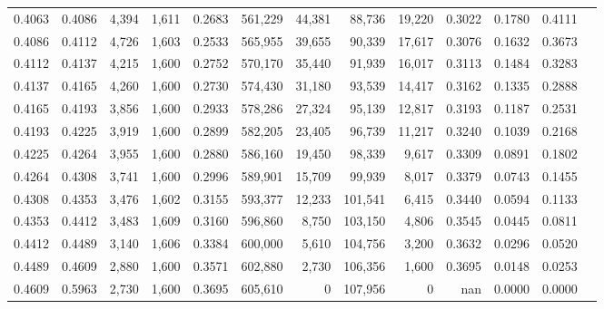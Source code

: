 \begin{tabular}{rrrrrrrrrrrrr}
0.4063 & 0.4086 &  4,394 & 1,611 &                                     0.2683 & 561,229 &  44,381 &  88,736 &  19,220 & 0.3022 & 0.1780 & 0.4111 \\
0.4086 & 0.4112 &  4,726 & 1,603 &                                     0.2533 & 565,955 &  39,655 &  90,339 &  17,617 & 0.3076 & 0.1632 & 0.3673 \\
0.4112 & 0.4137 &  4,215 & 1,600 &                                     0.2752 & 570,170 &  35,440 &  91,939 &  16,017 & 0.3113 & 0.1484 & 0.3283 \\
0.4137 & 0.4165 &  4,260 & 1,600 &                                     0.2730 & 574,430 &  31,180 &  93,539 &  14,417 & 0.3162 & 0.1335 & 0.2888 \\
0.4165 & 0.4193 &  3,856 & 1,600 &                                     0.2933 & 578,286 &  27,324 &  95,139 &  12,817 & 0.3193 & 0.1187 & 0.2531 \\
0.4193 & 0.4225 &  3,919 & 1,600 &                                     0.2899 & 582,205 &  23,405 &  96,739 &  11,217 & 0.3240 & 0.1039 & 0.2168 \\
0.4225 & 0.4264 &  3,955 & 1,600 &                                     0.2880 & 586,160 &  19,450 &  98,339 &   9,617 & 0.3309 & 0.0891 & 0.1802 \\
0.4264 & 0.4308 &  3,741 & 1,600 &                                     0.2996 & 589,901 &  15,709 &  99,939 &   8,017 & 0.3379 & 0.0743 & 0.1455 \\
0.4308 & 0.4353 &  3,476 & 1,602 &                                     0.3155 & 593,377 &  12,233 & 101,541 &   6,415 & 0.3440 & 0.0594 & 0.1133 \\
0.4353 & 0.4412 &  3,483 & 1,609 &                                     0.3160 & 596,860 &   8,750 & 103,150 &   4,806 & 0.3545 & 0.0445 & 0.0811 \\
0.4412 & 0.4489 &  3,140 & 1,606 &                                     0.3384 & 600,000 &   5,610 & 104,756 &   3,200 & 0.3632 & 0.0296 & 0.0520 \\
0.4489 & 0.4609 &  2,880 & 1,600 &                                     0.3571 & 602,880 &   2,730 & 106,356 &   1,600 & 0.3695 & 0.0148 & 0.0253 \\
0.4609 & 0.5963 &  2,730 & 1,600 &                                     0.3695 & 605,610 &       0 & 107,956 &       0 &    nan & 0.0000 & 0.0000 \\
\bottomrule
\end{tabular}
